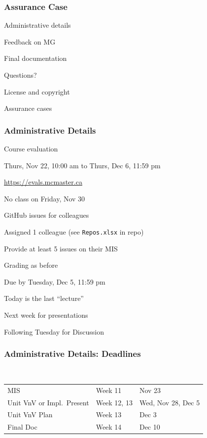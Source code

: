 \documentclass[t,12pt,numbers,fleqn]{beamer}
\begin{document}



\begin{frame}
\frametitle{Assurance Case}

\bi
\item Administrative details
\item Feedback on MG
\item Final documentation
\item Questions?
\item License and copyright
\item Assurance cases
\ei
\end{frame}


\begin{frame}
\frametitle{Administrative Details}

\bi
\item Course evaluation
\bi
\item Thurs, Nov 22, 10:00 am to Thurs, Dec 6, 11:59 pm
\item \url{https://evals.mcmaster.ca}
\ei
\item No class on Friday, Nov 30
\item GitHub issues for colleagues
\bi
\item Assigned 1 colleague (see \texttt{Repos.xlsx} in repo)
\item Provide at least 5 issues on their MIS
\item Grading as before
\item Due by Tuesday, Dec 5, 11:59 pm
\ei
\item Today is the last ``lecture''
\item Next week for presentations
\item Following Tuesday for Discussion
\ei

\end{frame}


\begin{frame}
\frametitle{Administrative Details: Deadlines}
~\newline
\begin{tabular}{l l l}
MIS & Week 11 & Nov 23\\
Unit VnV or Impl.\ Present & Week 12, 13 & Wed, Nov 28, Dec 5\\
Unit VnV Plan & Week 13 & Dec 3\\
Final Doc & Week 14 & Dec 10\\
\end {tabular}
\end{frame}
\end{document}
